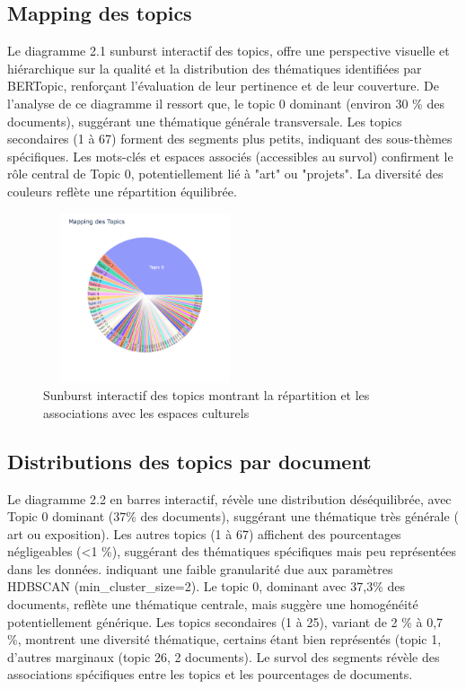 \documentclass[mstat,12pt]{unswthesis}
\begin{document}
\subsection{Mapping des topics }

Le diagramme 2.1 sunburst interactif des topics, offre une perspective visuelle et hiérarchique 
sur la qualité et la distribution des thématiques identifiées par BERTopic, renforçant 
l’évaluation de leur pertinence et de leur couverture.  
De l’analyse de ce diagramme il ressort que, le topic 0 dominant (environ 30 \% des 
documents), suggérant une thématique générale transversale. Les topics secondaires (1 à 67) 
forment des segments plus petits, indiquant des sous-thèmes spécifiques. Les mots-clés et 
espaces associés (accessibles au survol) confirment le rôle central de Topic 0, potentiellement 
lié à "art" ou "projets". La diversité des couleurs reflète une répartition équilibrée.

\begin{figure}[H]
    \centering
    \includegraphics[width=6cm,height=5cm]{MappingTopics.png}
    \caption{Sunburst interactif des topics montrant la répartition et les associations avec les espaces culturels}
    \label{fig:enquete}
\end{figure}

\subsection{Distributions des topics par document }

Le diagramme 2.2 en barres interactif, révèle une distribution déséquilibrée, avec Topic 0 
dominant (37\% des documents), suggérant une thématique très générale ( art ou exposition). 
Les autres topics (1 à 67) affichent des pourcentages négligeables (<1 \%), suggérant des 
thématiques spécifiques mais peu représentées dans les données. indiquant une faible 
granularité due aux paramètres HDBSCAN (min\_cluster\_size=2). 
Le topic 0, dominant avec 37,3\% des documents, reflète une thématique centrale, mais 
suggère une homogénéité potentiellement générique. Les topics secondaires (1 à 25), 
variant de 2 \% à 0,7 \%, montrent une diversité thématique, certains étant bien représentés 
(topic 1, d’autres marginaux (topic 26, 2 documents). Le survol des segments révèle des 
associations spécifiques entre les topics et les pourcentages de documents.
\end{document}
